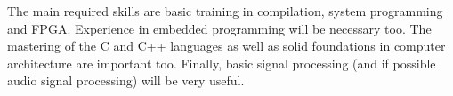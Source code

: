 \documentclass[a4paper,francais,11]{article}
\begin{document}
The main required skills are basic training in compilation, system programming and FPGA. Experience in embedded programming will be necessary too. The mastering of the C and C++ languages as well as solid foundations in computer architecture are important too. Finally, basic signal processing (and if possible audio signal processing)  will be very useful. 




 
\end{document}
